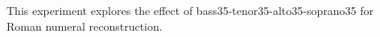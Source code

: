 
This experiment explores the effect of
\gls{bass35}-\gls{tenor35}-\gls{alto35}-\gls{soprano35} for
Roman numeral reconstruction.
